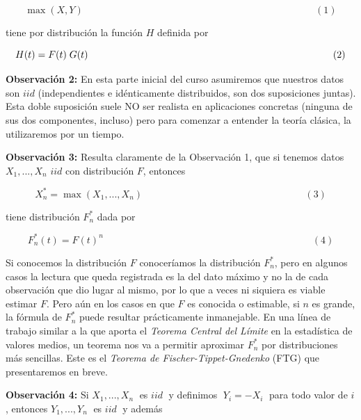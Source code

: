 \documentclass[
]{book}
\theoremstyle{definition}
\theoremstyle{definition}
\theoremstyle{definition}
\theoremstyle{definition}
\theoremstyle{remark}
\begin{document}
\begin{equation}
\max \left( X,Y \right)\hspace{10cm}(1)
\label{eq:1}
\end{equation}

tiene por distribución la función \(H\) definida por

\begin{equation}
H(t)= F(t)\; G(t)\hspace{8.9cm}(2)
\label{eq:2}
\end{equation}

\textbf{Observación 2:} En esta parte inicial del curso
asumiremos que nuestros datos son \(iid\)
(independientes e idénticamente distribuidos, son
dos suposiciones juntas). Esta doble suposición
suele NO ser realista en aplicaciones concretas
(ninguna de sus dos componentes, incluso) pero
para comenzar a entender la teoría clásica, la
utilizaremos por un tiempo.

\textbf{Observación 3:} Resulta claramente de la
Observación 1, que si tenemos datos \(X_1,...,X_n\) \(iid\) con distribución \(F\), entonces

\begin{equation}
X_n^{\ast}= \max \left( X_1,...,X_n \right)\hspace{7cm}(3)
\end{equation}

tiene distribución \(F_n^\ast\) dada por

\begin{equation}
F_n^\ast (t) = F(t)^n\hspace{9cm}(4)
\end{equation}

Si conocemos la distribución \(F\) conoceríamos la
distribución \(F_n^\ast\), pero en algunos casos la lectura
que queda registrada es la del dato máximo y no la
de cada observación que dio lugar al mismo, por lo
que a veces ni siquiera es viable estimar \(F\).
Pero aún en los casos en que \(F\) es conocida o
estimable, si \(n\) es grande, la fórmula de \(F_n^\ast\) puede resultar prácticamente inmanejable. En una línea de trabajo similar a la que aporta el \emph{Teorema
Central del Límite} en la estadística de valores
medios, un teorema nos va a permitir aproximar
\(F_n^\ast\) por distribuciones más sencillas. Este es el
\emph{Teorema de Fischer-Tippet-Gnedenko} (FTG) que presentaremos en breve.

\textbf{Observación 4:} Si \(X_1,...,X_n\;\) es \(iid\;\) y definimos
\(\;Y_i = -X_i\;\) para todo valor de \(i\), entonces \(Y_1,...,Y_n\;\) es \(iid\;\) y además
\end{document}
